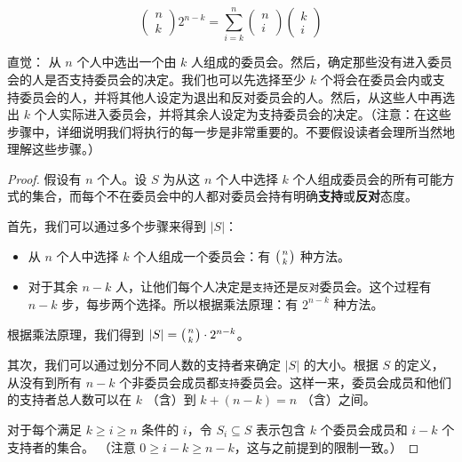 \begin{example}[支持/反对委员会恒等式]
    \[\begin{pmatrix}n\\k\end{pmatrix}2^{n-k} = \sum_{i=k}^{n}\begin{pmatrix}n\\i\end{pmatrix}\begin{pmatrix}k\\i\end{pmatrix}\]

    \begin{questions}{直觉：}
        从 $n$ 个人中选出一个由 $k$ 人组成的委员会。然后，确定那些没有进入委员会的人是否支持委员会的决定。我们也可以先选择至少 $k$ 个将会在委员会内或支持委员会的人，并将其他人设定为退出和反对委员会的人。然后，从这些人中再选出 $k$ 个人实际进入委员会，并将其余人设定为支持委员会的决定。（注意：在这些步骤中，详细说明我们将执行的每一步是非常重要的。不要假设读者会理所当然地理解这些步骤。）
    \end{questions}

    \begin{proof}
        假设有 $n$ 个人。设 $S$ 为从这 $n$ 个人中选择 $k$ 个人组成委员会的所有可能方式的集合，而每个不在委员会中的人都对委员会持有明确\textbf{支持}或\textbf{反对}态度。

        首先，我们可以通过多个步骤来得到 $|S|$：
        \begin{itemize}
            \item 从 $n$ 个人中选择 $k$ 个人组成一个委员会：有 $\big({n \atop k}\big)$ 种方法。
            \item 对于其余 $n-k$ 人，让他们每个人决定是\verb|支持|还是\verb|反对|委员会。这个过程有 $n-k$ 步，每步两个选择。所以根据乘法原理：有 $2^{n-k}$ 种方法。
        \end{itemize}
        根据乘法原理，我们得到 $|S| = \big({n \atop k}\big) \cdot 2^{n-k}$。

        其次，我们可以通过划分不同人数的支持者来确定 $|S|$ 的大小。根据 $S$ 的定义，从没有到所有 $n-k$ 个非委员会成员都\verb|支持|委员会。这样一来，委员会成员和他们的支持者总人数可以在 $k$ （含）到 $k + (n - k) = n$ （含）之间。

        对于每个满足 $k \ge i \ge n$ 条件的 $i$，令 $S_i \subseteq S$ 表示包含 $k$ 个委员会成员和 $i - k$ 个支持者的集合。 （注意 $0 \ge i - k \ge n - k$，这与之前提到的限制一致。）


\end{proof}
\end{example}
